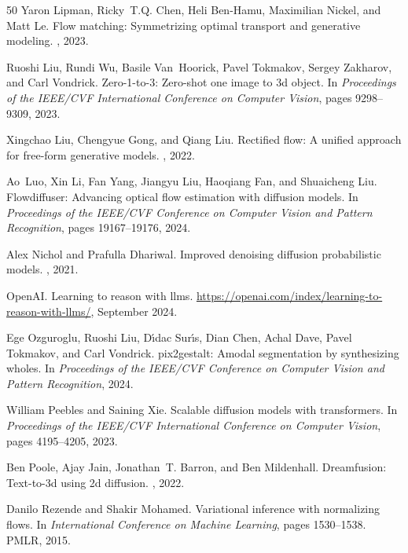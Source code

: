 \documentclass[manuscript,screen,review]{acmart}
\begin{document}
\begin{thebibliography}{50}
Yaron Lipman, Ricky~T.Q. Chen, Heli Ben-Hamu, Maximilian Nickel, and Matt Le.
\newblock Flow matching: Symmetrizing optimal transport and generative modeling.
, 2023.

Ruoshi Liu, Rundi Wu, Basile Van~Hoorick, Pavel Tokmakov, Sergey Zakharov, and Carl Vondrick.
\newblock Zero-1-to-3: Zero-shot one image to 3d object.
\newblock In {\em Proceedings of the IEEE/CVF International Conference on Computer Vision}, pages 9298--9309, 2023.

Xingchao Liu, Chengyue Gong, and Qiang Liu.
\newblock Rectified flow: A unified approach for free-form generative models.
, 2022.

Ao~Luo, Xin Li, Fan Yang, Jiangyu Liu, Haoqiang Fan, and Shuaicheng Liu.
\newblock Flowdiffuser: Advancing optical flow estimation with diffusion models.
\newblock In {\em Proceedings of the IEEE/CVF Conference on Computer Vision and Pattern Recognition}, pages 19167--19176, 2024.

Alex Nichol and Prafulla Dhariwal.
\newblock Improved denoising diffusion probabilistic models.
, 2021.

OpenAI.
\newblock Learning to reason with llms.
\newblock \url{https://openai.com/index/learning-to-reason-with-llms/}, September 2024.

Ege Ozguroglu, Ruoshi Liu, D{\'\i}dac Sur{\'\i}s, Dian Chen, Achal Dave, Pavel Tokmakov, and Carl Vondrick.
\newblock pix2gestalt: Amodal segmentation by synthesizing wholes.
\newblock In {\em Proceedings of the IEEE/CVF Conference on Computer Vision and Pattern Recognition}, 2024.

William Peebles and Saining Xie.
\newblock Scalable diffusion models with transformers.
\newblock In {\em Proceedings of the IEEE/CVF International Conference on Computer Vision}, pages 4195--4205, 2023.

Ben Poole, Ajay Jain, Jonathan~T. Barron, and Ben Mildenhall.
\newblock Dreamfusion: Text-to-3d using 2d diffusion.
, 2022.

Danilo Rezende and Shakir Mohamed.
\newblock Variational inference with normalizing flows.
\newblock In {\em International Conference on Machine Learning}, pages 1530--1538. PMLR, 2015.


\end{thebibliography}
\end{document}
